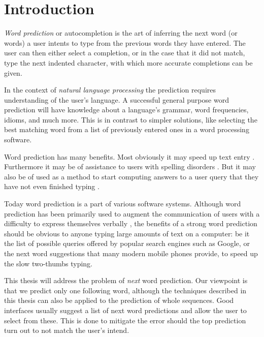 \chapter{Introduction}
\label{ch:introduction}

\emph{Word prediction} or autocompletion is the art of inferring the next
word (or words) a user intents to type from the previous words they have
entered.
The user can then either select a completion, or in the case that it did not
match, type the next indented character, with which more accurate completions
can be given.

In the context of \emph{natural language processing} the prediction requires
understanding of the user's language.
A successful general purpose word prediction will have knowledge about a
language's grammar, word frequencies, idioms, and much more.
This is in contrast to simpler solutions, like selecting the best matching word
from a list of previously entered ones in a word processing software.

Word prediction has many benefits.
Most obviously it may speed up text entry \parencite{Trnka2007}.
Furthermore it may be of assistance to users with spelling disorders
\parencite{Newell1992}.
But it may also be of used as a method to start computing answers to a user
query that they have not even finished typing \noref.

Today word prediction is a part of various software systems.
Although word prediction has been primarily used to augment the communication of
users with a difficulty to express themselves verbally
\parencite{Swiffin1987,Trnka2011}, the benefits of a strong word prediction
should be obvious to anyone typing large amounts of text on a computer:
be it the list of possible queries offered by popular search engines such as
Google, or the next word suggestions that many modern mobile phones provide, to
speed up the slow two-thumbs typing.

This thesis will address the problem of \emph{next} word prediction.
Our viewpoint is that we predict only one following word, although the
techniques described in this thesis can also be applied to the prediction
of whole sequences.
Good interfaces usually suggest a list of next word predictions and allow the
user to select from these.
This is done to mitigate the error should the top prediction turn out to not
match the user's intend.

